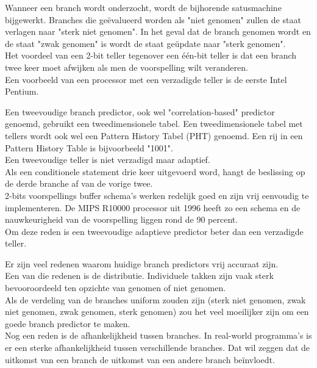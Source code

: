 Wanneer een branch wordt onderzocht, wordt de bijhorende satusmachine bijgewerkt.
Branches die geëvalueerd worden als "niet genomen" zullen de staat verlagen naar "sterk niet genomen".
In het geval dat de branch genomen wordt en de staat "zwak genomen" is wordt de staat geüpdate naar "sterk genomen".\\
Het voordeel van een 2-bit teller tegenover een één-bit teller is dat een branch twee keer moet afwijken als men de voorspelling wilt veranderen.\\

Een voorbeeld van een processor met een verzadigde teller is de eerste Intel Pentium.
\parencite{Fog2018}

Een tweevoudige branch predictor, ook wel "correlation-based" predictor genoemd, gebruikt een tweedimensionele tabel.
Een tweedimensionele tabel met tellers wordt ook wel een Pattern History Tabel (PHT) genoemd.
Een rij in een Pattern History Table is bijvoorbeeld "1001".\\
Een tweevoudige teller is niet verzadigd maar adaptief.\\
Als een conditionele statement drie keer uitgevoerd word, hangt de beslissing op de derde branche af van de vorige twee.\\

2-bits voorspellings buffer schema's werken redelijk goed en zijn vrij eenvoudig te implementeren.
De MIPS R10000 processor uit 1996 heeft zo een schema en de nauwkeurigheid van de voorspelling liggen rond de 90 percent.\\

Om deze reden is een tweevoudige adaptieve predictor beter dan een verzadigde teller.

Er zijn veel redenen waarom huidige branch predictors vrij accuraat zijn.\\
Een van die redenen is de distributie.
Individuele takken zijn vaak sterk bevooroordeeld ten opzichte van genomen of niet genomen.\\
Als de verdeling van de branches uniform zouden zijn (sterk niet genomen, zwak niet genomen, zwak genomen, sterk genomen) zou het veel moeilijker zijn om een goede branch predictor te maken.\\

Nog een reden is de afhankelijkheid tussen branches. In real-world programma's is er een sterke afhankelijkheid tussen verschillende branches. Dat wil zeggen dat de uitkomst van een branch de uitkomst van een andere branch beïnvloedt.\\

